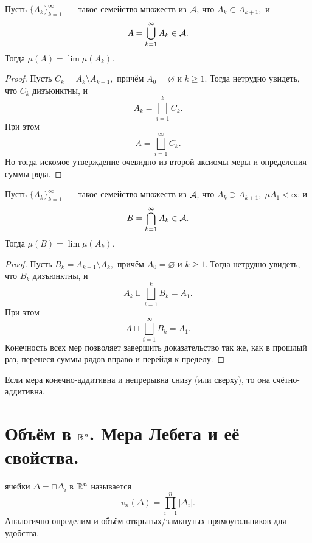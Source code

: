 \documentclass{notes}
\begin{document}
	\begin{pr}
		Пусть $\{A_k\}_{k = 1}^{\infty}$~--- такое семейство множеств из $\mathcal{A},$ что $A_k \subset A_{k + 1},$ и 
		\[
			A = \bigcup\limits_{k = 1}^{\infty} A_k \in \mathcal{A}.
		\]
		Тогда $\mu(A) = \lim \mu(A_k)$.
		\begin{proof}
			Пусть $C_k = A_{k} \setminus A_{k-1},$ причём $A_0 = \varnothing$ и $k \geqslant 1.$ Тогда нетрудно увидеть, что $C_k$ дизъюнктны, и
			\[
				A_k = \bigsqcup_{i = 1}^k C_k.
			\]
			При этом
			\[
				A = \bigsqcup_{i = 1}^{\infty} C_k.
			\]
			Но тогда искомое утверждение очевидно из второй аксиомы меры и определения суммы ряда.
		\end{proof}
	\end{pr}

	\begin{pr}
		Пусть $\{A_k\}_{k = 1}^{\infty}$~--- такое семейство множеств из $\mathcal{A},$ что $A_k \supset A_{k + 1}, \; \mu A_1 < \infty$ и 
		\[
			B = \bigcap\limits_{k = 1}^{\infty} A_k \in \mathcal{A}.
		\]
		Тогда $\mu(B) = \lim \mu(A_k)$.
		\begin{proof}
			Пусть $B_k = A_{k-1} \setminus A_{k},$ причём $A_0 = \varnothing$ и $k \geqslant 1.$ Тогда нетрудно увидеть, что $B_k$ дизъюнктны, и
			\[
				A_k \sqcup \bigsqcup_{i = 1}^k B_k = A_1.
			\]
			При этом
			\[
				A \sqcup \bigsqcup_{i = 1}^{\infty} B_k = A_1.
			\]
			Конечность всех мер позволяет завершить доказательство так же, как в прошлый раз, перенеся суммы рядов вправо и перейдя к пределу.
		\end{proof}
	\end{pr}

	\begin{thm}
		Если мера конечно-аддитивна и непрерывна снизу (или сверху), то она счётно-аддитивна.
	\end{thm} 

\section{Объём в \texorpdfstring{$\mathbb{R}^n$}{𝐑n}. Мера Лебега и её свойства.}

	\begin{de}
		 ячейки $\Delta = \sqcap \Delta_i$ в $\mathbb{R}^n$ называется
		\[
			v_n(\Delta) = \prod\limits_{i = 1}^n |\Delta_i|.
		\]
		Аналогично определим и объём открытых/замкнутых прямоугольников для удобства.
	\end{de}
\end{document}
